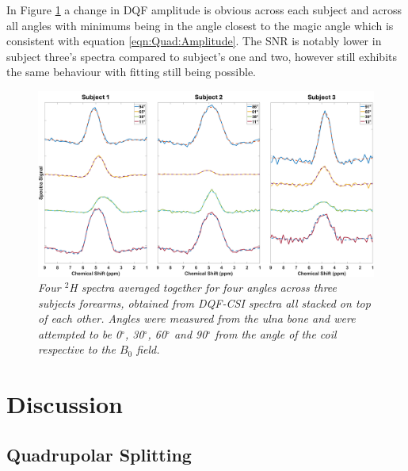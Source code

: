 In Figure \ref{fig:Quad:DQF_CSI_Angle} a change in \ac{DQF} amplitude is obvious across each subject and across all angles with minimums being in the angle closest to the magic angle which is consistent with equation \ref{eqn:Quad:Amplitude}. The \ac{SNR} is notably lower in subject three's spectra compared to subject's one and two, however still exhibits the same behaviour with fitting still being possible.

\begin{figure}
    \centering
    \includegraphics[width=1\textwidth]{Figures/Quad/DQF_CSI_Angle.png}
    \caption{\textit{Four $^2$H spectra averaged together for four angles across three subjects forearms, obtained from \ac{DQF}-\ac{CSI} spectra all stacked on top of each other. Angles were measured from the ulna bone and were attempted to be 0$^\circ$, 30$^\circ$, 60$^\circ$ and 90$^\circ$ from the angle of the coil respective to the $B_0$ field.}}
    \label{fig:Quad:DQF_CSI_Angle}
\end{figure}

\section{Discussion}

\subsection{Quadrupolar Splitting}

